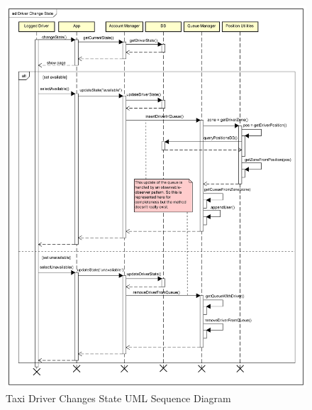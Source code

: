 \documentclass[a4paper]{article}
\begin{document}
\begin{figure}[H]
\includegraphics[width=\sequenceWidth]{Sequence-DriverChangeState}
\centering
\caption{Taxi Driver Changes State UML Sequence Diagram}
\label{fig:sequencedriverstate}
\end{figure}
\end{document}
